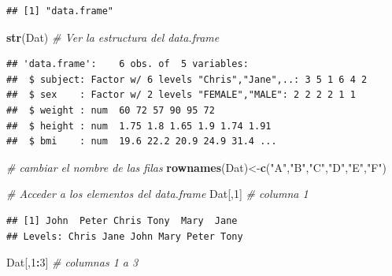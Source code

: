 \documentclass[]{book}
\newenvironment{Shaded}{\begin{snugshade}}{\end{snugshade}}
\newcommand{\KeywordTok}[1]{\textcolor[rgb]{0.13,0.29,0.53}{\textbf{#1}}}
\newcommand{\DecValTok}[1]{\textcolor[rgb]{0.00,0.00,0.81}{#1}}
\newcommand{\StringTok}[1]{\textcolor[rgb]{0.31,0.60,0.02}{#1}}
\newcommand{\CommentTok}[1]{\textcolor[rgb]{0.56,0.35,0.01}{\textit{#1}}}
\newcommand{\OperatorTok}[1]{\textcolor[rgb]{0.81,0.36,0.00}{\textbf{#1}}}
\newcommand{\NormalTok}[1]{#1}
\begin{document}
\begin{Shaded}
\end{Shaded}

\begin{verbatim}
## [1] "data.frame"
\end{verbatim}

\begin{Shaded}
\begin{Highlighting}[]
\KeywordTok{str}\NormalTok{(Dat) }\CommentTok{# Ver la estructura del data.frame}
\end{Highlighting}
\end{Shaded}

\begin{verbatim}
## 'data.frame':    6 obs. of  5 variables:
##  $ subject: Factor w/ 6 levels "Chris","Jane",..: 3 5 1 6 4 2
##  $ sex    : Factor w/ 2 levels "FEMALE","MALE": 2 2 2 2 1 1
##  $ weight : num  60 72 57 90 95 72
##  $ height : num  1.75 1.8 1.65 1.9 1.74 1.91
##  $ bmi    : num  19.6 22.2 20.9 24.9 31.4 ...
\end{verbatim}

\begin{Shaded}
\begin{Highlighting}[]
\CommentTok{# cambiar el nombre de las filas}
\KeywordTok{rownames}\NormalTok{(Dat)<-}\KeywordTok{c}\NormalTok{(}\StringTok{"A"}\NormalTok{,}\StringTok{"B"}\NormalTok{,}\StringTok{"C"}\NormalTok{,}\StringTok{"D"}\NormalTok{,}\StringTok{"E"}\NormalTok{,}\StringTok{"F"}\NormalTok{)}

\CommentTok{# Acceder a los elementos del data.frame}
\NormalTok{Dat[,}\DecValTok{1}\NormalTok{]     }\CommentTok{# columna 1}
\end{Highlighting}
\end{Shaded}

\begin{verbatim}
## [1] John  Peter Chris Tony  Mary  Jane 
## Levels: Chris Jane John Mary Peter Tony
\end{verbatim}

\begin{Shaded}
\begin{Highlighting}[]
\NormalTok{Dat[,}\DecValTok{1}\OperatorTok{:}\DecValTok{3}\NormalTok{]   }\CommentTok{# columnas 1 a 3}
\end{Highlighting}
\end{Shaded}
\end{document}

